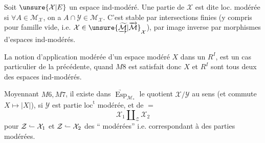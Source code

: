 Soit $\unsure{\mathcal X|E}$ un espace ind-modéré. Une partie  de $\mathcal X$ est dite loc. modérée si $\forall A\in\mathcal M_{\mathcal X}$, on a $A\cap\mathcal Y\in\mathcal M_{\mathcal X}$. C'est stable par intersections finies (y compris pour famille vide, i.e. $\mathcal X\in\unsure{\underrightarrow{\widetilde{\mathcal M}}|\overrightarrow{\mathcal M}}_{\mathcal X}$), par image inverse par morphismes  d'espaces ind-modérés.

La notion d'application modérée d'un espace modéré $X$ dans un $R^I$, est un cas particulier de la précédente, quand $M8$ est satisfait donc $X$ et $R^I$ sont tous deux des espaces ind-modérés.

Moyennant $M6,M7$, il existe  dans $\underrightarrow{\operatorname{Esp}}_{\mathcal M_*}$ le quotient $\mathcal X/\mathcal Y$ au sens (et commute  $X\mapsto|X|$), si $\mathcal Y$ est partie $\mathrm{loc}^{\mathrm t}$ modérée, et de $=$
\[
 \mathcal X_1\amalg_{\mathcal Z}\mathcal X_2
\]
pour $\mathcal Z\lhook\joinrel\relbar\mathcal X_1$ et $\mathcal Z\lhook\joinrel\relbar\mathcal X_2$ des `` modérées'' i.e. correspondant à des parties  modérées.
